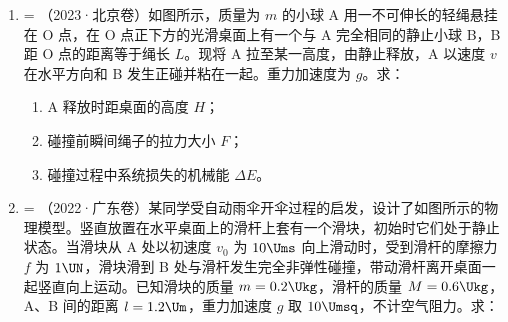 \documentclass[\gkver]{gaokaozhenti}
\makeatletter
\newcommand{\tiinfo}[2]{{\small\color{gray}（#1）\textcolor{orange!85!black}{\nandu{#2}}}\hspace{0.4em}}
\newenvironment{tibody}
  {\begin{minipage}[t]{\linewidth}\@listdepth=\@ne\leavevmode\ignorespaces}
  {\end{minipage}}
\makeatother
\begin{document}
\begin{enumerate}[resume=tiku]
\item
\begin{tibody}
\tiinfo{2023·北京卷}{2}如图所示，质量为 $m$ 的小球 A 用一不可伸长的轻绳悬挂在 O 点，在 O 点正下方的光滑桌面上有一个与 A 完全相同的静止小球 B，B 距 O 点的距离等于绳长 $L$。现将 A 拉至某一高度，由静止释放，A 以速度 $v$ 在水平方向和 B 发生正碰并粘在一起。重力加速度为 $g$。求：
\begin{enumerate}
	\item
	A 释放时距桌面的高度 $H$；
	\item
	碰撞前瞬间绳子的拉力大小 $F$；
	\item
	碰撞过程中系统损失的机械能 $\Delta E$。
\end{enumerate}
\end{tibody}


\item
\begin{tibody}
\tiinfo{2022·广东卷}{2}某同学受自动雨伞开伞过程的启发，设计了如图所示的物理模型。竖直放置在水平桌面上的滑杆上套有一个滑块，初始时它们处于静止状态。当滑块从 A 处以初速度 $v_{0}$ 为 $10\Ums$ 向上滑动时，受到滑杆的摩擦力 $f$ 为 $1\UN$，滑块滑到 B 处与滑杆发生完全非弹性碰撞，带动滑杆离开桌面一起竖直向上运动。已知滑块的质量 $m = 0.2\Ukg$，滑杆的质量 $M = 0.6\Ukg$，A、B 间的距离 $l = 1.2\Um$，重力加速度 $g$ 取 $10\Umsq$，不计空气阻力。求：


\end{tibody}
\end{enumerate}
\end{document}
